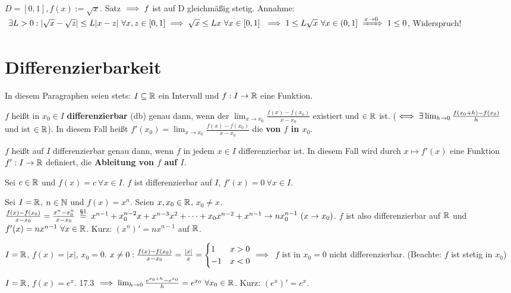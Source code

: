 \documentclass[a4paper,oneside,DIV15,BCOR12mm]{scrbook}
\begin{document}
\begin{beispiel}
$D=[0,1], f(x):=\sqrt{x}$. Satz $\implies f$ ist auf D gleichmäßig stetig. Annahme: $\ \exists L>0: |\sqrt{x}-\sqrt{z}|\le L|x-z| \ \forall x,z \in [0,1] \folgt \sqrt{x} \le Lx\ \forall x \in [0,1]\ \folgt 1\le L\sqrt{x}\ \forall x \in (0,1] \folgtwegen{x\to0}1\le0$, Widerspruch!
\end{beispiel}

\chapter{Differenzierbarkeit}

In diesem Paragraphen seien stets: $I\subseteq\mathbb{R}$ ein Intervall und $f:I\to\mathbb{R}$ eine Funktion.

\begin{definition}
\begin{liste}
\item $f$ heißt in $x_0\in I$ \textbf{differenzierbar} (db) genau dann, wenn der $\lim_{x\to x_0}\frac{f(x) - f(x_0) }{x-x_0}$ existiert und $\in\mathbb{R}$ ist. ($\iff \exists \lim_{h\to0}\frac{f(x_0+h) - f(x_0)}{h}$ und ist $\in\mathbb{R}$). In diesem Fall heißt $f'(x_0) = \lim_{x\to x_0}\frac{f(x) - f(x_0) }{x-x_0}$ die  \textbf{von $f$ in $x_0$}.

\item $f$ heißt auf $I$ differenzierbar genau dann, wenn $f$ in jedem $x\in I$ differenzierbar ist. In diesem Fall wird durch $x\mapsto f'(x)$ eine Funktion $f': I\to\mathbb{R}$ definiert, die \textbf{Ableitung von $f$ auf $I$}.
\end{liste}
\end{definition}

\begin{beispiele}
\item Sei $c\in\mathbb{R}$ und $f(x)=c\ \forall x\in I$. $f$ ist differenzierbar auf $I$, $f'(x)=0 \ \forall x \in I$.
\item Sei $I=\mathbb{R} $, $n\in\mathbb{N}$ und $f(x)=x^n$. Seien $x, x_0 \in\mathbb{R}$, $x_0 \ne x$. $\frac{f(x)-f(x_0)}{x-x_0} = \frac{x^n-x_0^n}{x-x_0} \gleichnach{§1} x^{n-1}+x_0^{n-2}x+x^{n-3}x^2+\cdots +x_0x^{n-2} + x^{n-1} \to nx_0^{n-1}\ (x\to x_0)$. $f$ ist also differenzierbar auf $\mathbb{R}$ und $f'(x) = nx^{n-1} \ \forall x\in\mathbb{R}$. Kurz: $(x^n)' = nx^{n-1}$ auf $\mathbb{R}$.
\item $I=\mathbb{R}$, $f(x)=|x|$, $x_0 = 0$. $x\ne0: \frac{f(x)-f(x_0)}{x-x_0} = \frac{|x|}{x} = \begin{cases}1&x>0\\-1&x<0\end{cases} \implies$ $f$ ist in $x_0=0$ nicht differenzierbar. (Beachte: $f$ ist stetig in $x_0$)
\item $I=\mathbb{R}$, $f(x)=e^x$. 17.3 $\implies \lim_{h\to0}\frac{e^{x_0+h} - e^{x_0}}{h} = e^{x_0} \ \forall x_0 \in\mathbb{R}$. Kurz: $(e^x)' = e^x$.
\end{beispiele}
\end{document}
